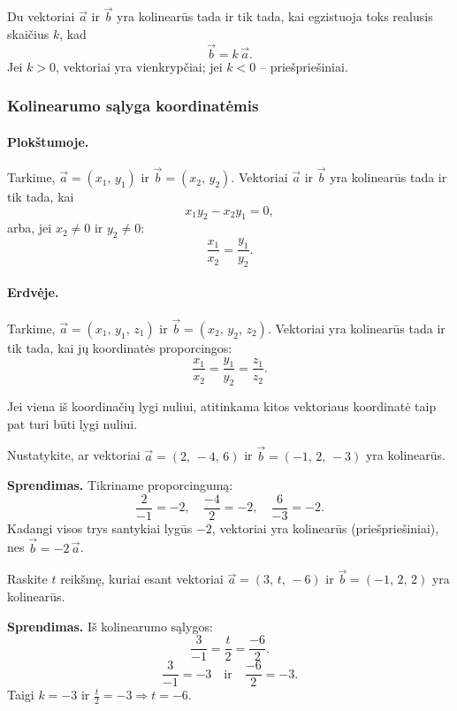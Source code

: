 \begin{tcolorbox}[colback=blue!5!white, colframe=blue!60!black, title=Kolinearumo požymis]
Du vektoriai $\vec{a}$ ir $\vec{b}$ yra kolinearūs tada ir tik tada, kai egzistuoja toks realusis skaičius $k$, kad
\[
\vec{b} = k\,\vec{a}.
\]
Jei $k > 0$, vektoriai yra vienkrypčiai; jei $k < 0$ – priešpriešiniai.
\end{tcolorbox}

\subsubsection{Kolinearumo sąlyga koordinatėmis}

\paragraph{Plokštumoje.}
Tarkime, $\vec{a} = (x_1,\, y_1)$ ir $\vec{b} = (x_2,\, y_2)$. Vektoriai $\vec{a}$ ir $\vec{b}$ yra kolinearūs tada ir tik tada, kai
\[
x_1 y_2 - x_2 y_1 = 0,
\]
arba, jei $x_2 \neq 0$ ir $y_2 \neq 0$:
\[
\frac{x_1}{x_2} = \frac{y_1}{y_2}.
\]

\paragraph{Erdvėje.}
Tarkime, $\vec{a} = (x_1,\, y_1,\, z_1)$ ir $\vec{b} = (x_2,\, y_2,\, z_2)$. Vektoriai yra kolinearūs tada ir tik tada, kai jų koordinatės proporcingos:
\[
\frac{x_1}{x_2} = \frac{y_1}{y_2} = \frac{z_1}{z_2}.
\]

\begin{remark}
Jei viena iš koordinačių lygi nuliui, atitinkama kitos vektoriaus koordinatė taip pat turi būti lygi nuliui.
\end{remark}

\begin{example}
Nustatykite, ar vektoriai $\vec{a} = (2,\, -4,\, 6)$ ir $\vec{b} = (-1,\, 2,\, -3)$ yra kolinearūs.

\textbf{Sprendimas.} Tikriname proporcingumą:
\[
\frac{2}{-1} = -2, \quad \frac{-4}{2} = -2, \quad \frac{6}{-3} = -2.
\]
Kadangi visos trys santykiai lygūs $-2$, vektoriai yra kolinearūs (priešpriešiniai), nes $\vec{b} = -2\,\vec{a}$.
\end{example}

\begin{example}
Raskite $t$ reikšmę, kuriai esant vektoriai $\vec{a} = (3,\, t,\, -6)$ ir $\vec{b} = (-1,\, 2,\, 2)$ yra kolinearūs.

\textbf{Sprendimas.} Iš kolinearumo sąlygos:
\[
\frac{3}{-1} = \frac{t}{2} = \frac{-6}{2}.
\]
\[
\frac{3}{-1} = -3 \quad \text{ir} \quad \frac{-6}{2} = -3.
\]
Taigi $k = -3$ ir $\frac{t}{2} = -3 \Rightarrow t = -6$.
\end{example}

